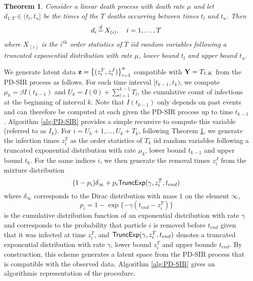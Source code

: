 \documentclass[11pt]{article}
\newtheorem{theorem}{Theorem}[section]
\begin{document}
	\begin{theorem}
		\label{theo:ldp}
		Consider a linear death process with death rate $\mu$ and let $d_{1:T} \in (t_l, t_u]$ be the times of the $T$ deaths occurring between times $t_l$ and $t_u$. Then 
		$$d_i \,{\buildrel d \over =}\, X_{(i)}, \quad i = 1, \dots, T$$
		where $X_{(i)}$ is the $i^{\text{th}}$ order statistics of $T$ iid random variables following a truncated exponential distribution with rate $\mu$, lower bound $t_l$ and upper bound $t_u$.
	\end{theorem}	
	
	We generate latent data  $\mathbf{z} = \left\lbrace (z^T_i, z^J_i)\right\rbrace_{i=1}^{n}$ compatible with $\mathbf{Y} = T_{1:K}$ from the PD-SIR process as follows. For each time interval $[t_{k-1}, t_k)$, we compute $\mu_k = \beta I(t_{k-1})$ and $U_k = I(0) + \sum_{l=1}^{k-1} T_l$, the cumulative count of infections at the beginning of interval $k$. Note that $I(t_{k-1})$ only depends on past events and can therefore be computed at each given the PD-SIR process up to time $t_{k-1}$. Algorithm \ref{alg:PD-SIR} provides a simple recursive to compute this variable (referred to as $I_k$). For $i = U_k + 1, \dots, U_k + T_k$, following Theorem \ref{theo:ldp}, we generate the infection times $z^T_i$ as the order statistics of $T_k$ iid random variables following a truncated exponential distribution with rate $\mu_k$, lower bound $t_{k-1}$ and upper bound $t_k$. For the same indices $i$, we then generate the removal times $z^J_i$ from the mixture distribution
	$$(1 - p_i) \delta_{\infty} + p_i \textsf{TruncExp}(\gamma, z^T_i, t_{end}) $$
	where $\delta_{\infty}$ corresponds to the Dirac distribution with mass $1$ on the element $\infty$,
	$$p_i = 1 - \exp\{-\gamma (t_{end} - z^T_i)\}$$
	is the cumulative distribution function of an exponential distribution with rate $\gamma$ and corresponds to the probability that particle $i$ is removed before $t_{end}$ given that it was infected at time $z^T_i$, and $\textsf{TruncExp}(\gamma, z^T_i, t_{end})$ denotes a truncated exponential distribution with rate $\gamma$, lower bound $z^T_i$ and upper bounde $t_{end}$. By construction, this scheme generates a latent space from the PD-SIR process that is compatible with the observed data. Algorithm \ref{alg:PD-SIR} gives an algorithmic representation of the procedure.
						
\end{document}
